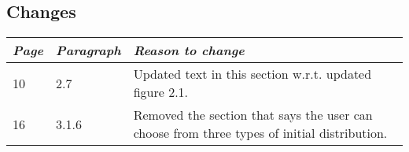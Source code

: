 \subsection*{Changes}
\begin{tabular}{llp{10cm}}
    \toprule
    \emph{Page} & \emph{Paragraph} & \emph{Reason to change} \\
    \midrule
   10 & 2.7 & Updated text in this section w.r.t. updated figure 2.1. \\
   16 & 3.1.6 & Removed the section that says the user can choose from three types of initial distribution. \\
    \bottomrule
\end{tabular}